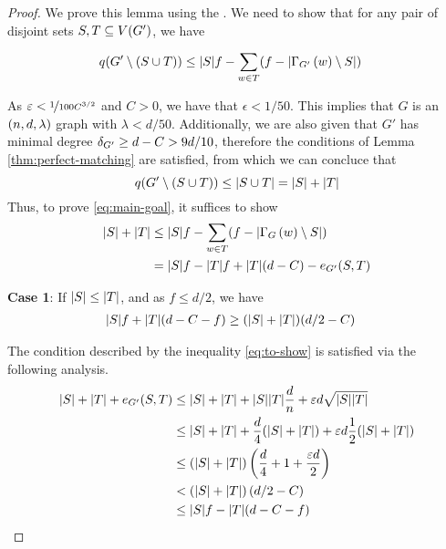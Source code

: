 \documentclass[11pt]{article}
\begin{document}
\begin{proof}
  We prove this lemma using the .
  We need to show that for any pair of disjoint sets $S, T \subseteq \Vertices{G'}$, we have

  \begin{align}
    \OddComponents{G' \setminus (S \cup T)} &\le \Size{S}f - \sum_{w \in T} (f - \Size{\Neighbourhood{G'}{w} \setminus S}) \label{eq:main-goal}
  \end{align}

  As $\epsilon < \nicefrac{1}{100C^{3/2}}$ and $C > 0$, we have that $\epsilon < 1/50$.
This implies that $G$ is an $\EnDeeLambda$ graph with $\lambda < d/50$.
Additionally, we are also given that $G'$ has minimal degree $\MinimalDegree{G'} \ge d - C >  9d/10$, therefore the conditions of Lemma \ref{thm:perfect-matching} are satisfied, from which we can concluce that $$\OddComponents{G' \setminus (S \cup T)} \le \Size{S \cup T} = |S| + |T|$$
Thus, to prove \eqref{eq:main-goal}, it suffices to show
  \begin{align}
    |S| + |T| &\le |S|f - \sum_{w \in T} (f - \Size{\Neighbourhood{G}{w} \setminus S})   \\
              &=\Size{S}f - \Size{T}f + \Size{T}(d-C) - \CutEdges{S}{T}{G'}  \label{eq:to-show}
  \end{align}  

  \textbf{Case 1}: If $\Size{S} \leq \Size{T}$, and as $f \leq d/2$, we have 
  \begin{align}
    \Size{S}f + \Size{T}(d-C-f)  &\ge (\Size{S} + \Size{T})(d/2 -C) \label{eq:to-show-1}
  \end{align}

  The condition described by the inequality \eqref{eq:to-show} is satisfied via the following analysis.
\begin{align}
  |S| + |T| + \CutEdges{S}{T}{G'} &\le  |S| + |T| + |S||T|\frac{d}{n} + \epsilon d \sqrt{\Size{S}\Size{T}} \label{eq:eml}\\
                                 &\le |S| + |T| + \frac{d}{4}(\Size{S} + \Size{T}) + \epsilon d \frac{1}{2}(\Size{S} + \Size{T}) \label{eq:algebra}\\
                                 &\le (\Size{S} + \Size{T})\left(\frac{d}{4} + 1 + \frac{
                                   \epsilon d}{2}\right) \\
                                 &<  (\Size{S} + \Size{T})\left(d/2-C\right) \label{eq:eps-assumption}\\
                                 &\le \Size{S}f - \Size{T}(d-C-f) \label{eq:plug}
 \end{align}  
  

\end{proof}
\end{document}
